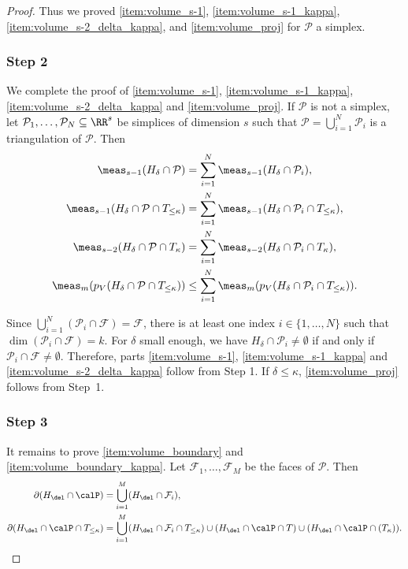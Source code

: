 \begin{proof}
Thus we proved \eqref{item:volume_s-1}, \eqref{item:volume_s-1_kappa}, \eqref{item:volume_s-2_delta_kappa}, and \eqref{item:volume_proj} for $\mathcal P$ a simplex.

\subsubsection*{Step 2} We complete the proof of \eqref{item:volume_s-1}, \eqref{item:volume_s-1_kappa}, \eqref{item:volume_s-2_delta_kappa} and \eqref{item:volume_proj}. If $\mathcal P$ is not a simplex,
let $\mathcal P_1,\dots,\mathcal P_N\subseteq\RR^s$ be simplices of dimension $s$
such that $\mathcal P=\bigcup_{i=1}^N\mathcal P_i$ is a triangulation of $\mathcal P$.
Then
\begin{gather*}
\meas_{s-1}(H_\delta\cap\mathcal P)=\sum_{i=1}^N\meas_{s-1}(H_\delta\cap\mathcal P_i),\\
\meas_{s-1}(H_\delta\cap\mathcal P\cap T_{\leq\kappa})
=\sum_{i=1}^N\meas_{s-1}(H_\delta\cap\mathcal P_i\cap T_{\leq\kappa}),\\
\meas_{s-2} (H_\delta \cap \mathcal P \cap T_{\kappa})
=\sum_{i=1}^N\meas_{s-2} (H_\delta \cap \mathcal P_i \cap T_{\kappa}),\\
\meas_m (p_V(H_\delta\cap \mathcal P\cap T_{\leq\kappa}))\leq\sum_{i=1}^N\meas_m (p_V(H_\delta\cap \mathcal P_i\cap T_{\leq\kappa})).
\end{gather*}

Since $\bigcup_{i=1}^N(\mathcal P_i\cap\mathcal F)=\mathcal F$,
there is at least one index $i\in\{1,\dots,N\}$ such that $\dim(\mathcal P_i\cap\mathcal F)=k$.
For $\delta$ small enough, we have $H_\delta\cap\mathcal P_i\neq\emptyset$ if and only if
$\mathcal P_i\cap\mathcal F\neq\emptyset$.
Therefore, parts \eqref{item:volume_s-1}, \eqref{item:volume_s-1_kappa}
and \eqref{item:volume_s-2_delta_kappa} follow from Step 1. If $\delta\leq\kappa$, \eqref{item:volume_proj} follows from Step~1.

\subsubsection*{Step 3} It remains to prove \eqref{item:volume_boundary} and \eqref{item:volume_boundary_kappa}.
Let $\mathcal F_1,\dots, \mathcal F_M$ be the faces of $\mathcal P$. Then
\begin{align*}
\partial (H_{\del}\cap \calP)
&=\bigcup_{i=1}^M (H_{\del}\cap \mathcal F_i),\\
\partial (H_{\del}\cap \calP\cap T_{\leq\kappa})
&=\bigcup_{i=1}^M (H_{\del}\cap \mathcal F_i\cap T_{\leq\kappa})
\cup (H_{\del}\cap \calP\cap T)
\cup (H_{\del}\cap \calP\cap (T_{\kappa})).
\end{align*}


\end{proof}
